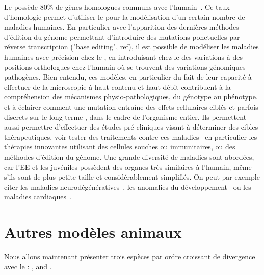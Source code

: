 \documentclass[\main/main.tex]{subfiles}
\begin{document}
%
Le \pz{} possède 80\% de gènes homologues communs avec l'humain~\cite{howe_2013}. 
Ce taux d'homologie permet d'utiliser le \pz{} pour la modélisation d'un certain nombre de maladies humaines.
En particulier avec l'apparition des dernières méthodes d'édition du génome permettant d'introduire des mutations ponctuelles par réverse transcription ("base editing", ref), il est possible de modéliser les maladies humaines avec précision chez le \pz{}, en introduisant chez le \pz{} des variations à des positions orthologues chez l'humain où se trouvent des variations génomiques pathogènes.
Bien entendu, ces modèles, en particulier du fait de leur capacité à effectuer de la microscopie à haut-contenu et haut-débit contribuent à la compréhension des mécanismes physio-pathologiques, du génotype au phénotype, et à éclairer comment une mutation entraîne des effets cellulaires ciblés et parfois discrets sur le long terme , dans le cadre de l'organisme entier.
Ils permettent aussi permettre d'effectuer des études pré-cliniques visant à déterminer des cibles thérapeutiques, voir tester des traitements contre ces maladies~\cite{vaz_2018,pitchai_2019,saleem_2018} en particulier les thérapies innovantes utilisant des cellules souches ou immunitaires, ou des méthodes d'édition du génome. 
%
Une grande diversité de maladies sont abordées, car l'EE et les juvéniles possèdent des organes très similaires à l'humain, même s'ils sont de plus petite taille et considérablement simplifiés. On peut par exemple citer les maladies neurodégénératives~\cite{fontana_2018}, les anomalies du développement~\cite{lovely_2016,sarmah_2016} ou les maladies cardiaques~\cite{brown_2016, walcott_2014}.

\section{Autres modèles animaux\label{sec:intro:modele}}

Nous allons maintenant présenter trois espèces par ordre croissant de divergence avec le \pz{}: \ol, \xl{} and \mm{}.

    \subsection{\label{sec:medaka}\ol}
    
\end{document}
